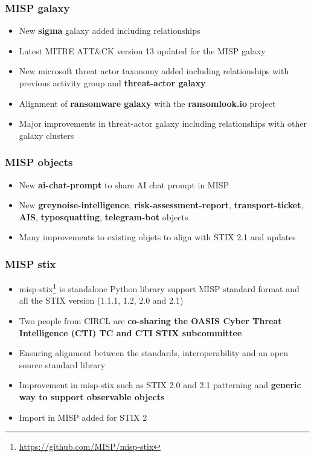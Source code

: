 \begin{frame}
    \frametitle{MISP galaxy}
    \begin{itemize}
        \item New {\bf sigma} galaxy added including relationships
        \item Latest MITRE ATT\&CK version 13 updated for the MISP galaxy
        \item New microsoft threat actor taxonomy added including relationships with previous activity group and {\bf threat-actor galaxy}
        \item Alignment of {\bf ransomware galaxy} with the {\bf ransomlook.io} project
        \item Major improvements in threat-actor galaxy including relationships with other galaxy clusters
    \end{itemize}
\end{frame}

\begin{frame}
    \frametitle{MISP objects}
    \begin{itemize}
        \item New {\bf ai-chat-prompt} to share AI chat prompt in MISP
        \item New {\bf greynoise-intelligence}, {\bf risk-assessment-report}, {\bf transport-ticket}, {\bf AIS}, {\bf typosquatting}, {\bf telegram-bot} objects
        \item Many improvements to existing objets to align with STIX 2.1 and updates
    \end{itemize}
\end{frame}

\begin{frame}
     \frametitle{MISP stix}
     \begin{itemize}
        \item misp-stix\footnote{\url{https://github.com/MISP/misp-stix}} is standalone Python library support MISP standard format and all the STIX version (1.1.1, 1.2, 2.0 and 2.1)
        \item Two people from CIRCL are {\bf co-sharing the OASIS Cyber Threat Intelligence (CTI) TC and CTI STIX subcommittee}
        \item Ensuring alignment between the standards, interoperability and an open source standard library
        \item Improvement in misp-stix such as STIX 2.0 and 2.1 patterning and {\bf generic way to support observable objects}
        \item Import in MISP added for STIX 2
     \end{itemize}
\end{frame}

